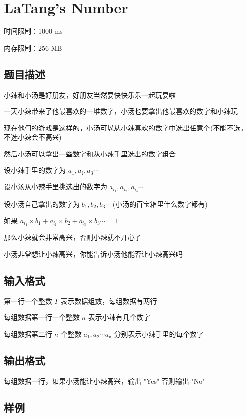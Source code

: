 \documentclass[UTF8]{ctexart}
\begin{document}
\newpage
\section{LaTang's Number}

时间限制：1000 ms

内存限制：256 MB

\subsection{题目描述}

小辣和小汤是好朋友，好朋友当然要快快乐乐一起玩耍啦

一天小辣带来了他最喜欢的一堆数字，小汤也要拿出他最喜欢的数字和小辣玩

现在他们的游戏是这样的，小汤可以从小辣喜欢的数字中选出任意个(不能不选，不选小辣会不高兴)

然后小汤可以拿出一些数字和从小辣手里选出的数字组合

设小辣手里的数字为 $a_1, a_2, a_3 \cdots$

设小汤从小辣手里挑选出的数字为 $a_{i_1},a_{i_2},a_{i_3}\cdots$

设小汤自己拿出的数字为 $b_1, b_2, b_3 \cdots$ (小汤的百宝箱里什么数字都有)

如果 $a_{i_1}\times b_1+a_{i_2}\times b_2+a_{i_3}\times b_3 \cdots = 1$

那么小辣就会非常高兴，否则小辣就不开心了

小汤非常想让小辣高兴，你能告诉小汤他能否让小辣高兴吗

\subsection{输入格式}

第一行一个整数 $T$ 表示数据组数，每组数据有两行

每组数据第一行一个整数 $n$ 表示小辣有几个数字

每组数据第二行 $n$ 个整数 $a_1, a_2\cdots a_n$ 分别表示小辣手里的每个数字

\subsection{输出格式}

每组数据一行，如果小汤能让小辣高兴，输出 "Yes" 否则输出 "No"

\subsection{样例}
\end{document}
